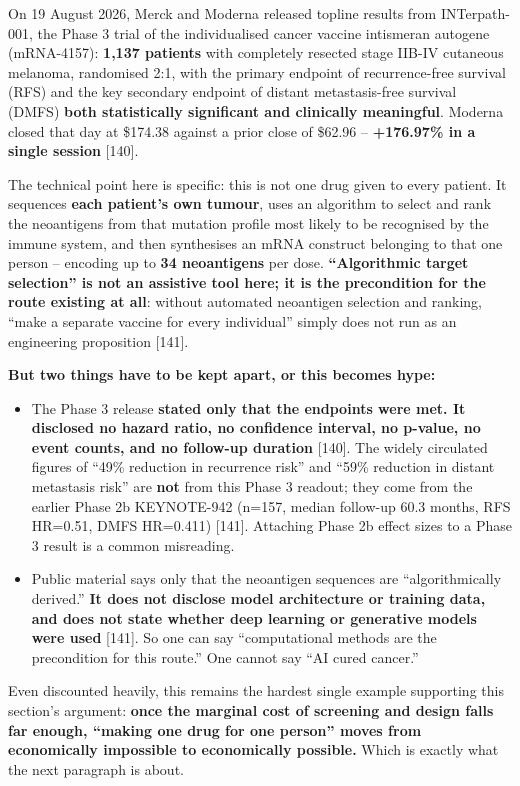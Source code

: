 \documentclass[11pt,a4paper]{article}
\begin{document}
On 19 August 2026, Merck and Moderna released topline results from INTerpath-001, the Phase 3 trial of the individualised cancer vaccine intismeran autogene (mRNA-4157): \textbf{1,137 patients} with completely resected stage IIB-IV cutaneous melanoma, randomised 2:1, with the primary endpoint of recurrence-free survival (RFS) and the key secondary endpoint of distant metastasis-free survival (DMFS) \textbf{both statistically significant and clinically meaningful}. Moderna closed that day at \$174.38 against a prior close of \$62.96 -- \textbf{+176.97\% in a single session}{} [140].

The technical point here is specific: this is not one drug given to every patient. It sequences \textbf{each patient's own tumour}, uses an algorithm to select and rank the neoantigens from that mutation profile most likely to be recognised by the immune system, and then synthesises an mRNA construct belonging to that one person -- encoding up to \textbf{34 neoantigens} per dose. \textbf{``Algorithmic target selection'' is not an assistive tool here; it is the precondition for the route existing at all}: without automated neoantigen selection and ranking, ``make a separate vaccine for every individual'' simply does not run as an engineering proposition [141].

\textbf{But two things have to be kept apart, or this becomes hype:}

\begin{itemize}
  \item The Phase 3 release \textbf{stated only that the endpoints were met. It disclosed no hazard ratio, no confidence interval, no p-value, no event counts, and no follow-up duration}{} [140]. The widely circulated figures of ``49\% reduction in recurrence risk'' and ``59\% reduction in distant metastasis risk'' are \textbf{not} from this Phase 3 readout; they come from the earlier Phase 2b KEYNOTE-942 (n=157, median follow-up 60.3 months, RFS HR=0.51, DMFS HR=0.411) [141]. Attaching Phase 2b effect sizes to a Phase 3 result is a common misreading.
  \item Public material says only that the neoantigen sequences are ``algorithmically derived.'' \textbf{It does not disclose model architecture or training data, and does not state whether deep learning or generative models were used}{} [141]. So one can say ``computational methods are the precondition for this route.'' One cannot say ``AI cured cancer.''
\end{itemize}

Even discounted heavily, this remains the hardest single example supporting this section's argument: \textbf{once the marginal cost of screening and design falls far enough, ``making one drug for one person'' moves from economically impossible to economically possible.} Which is exactly what the next paragraph is about.
\end{document}
